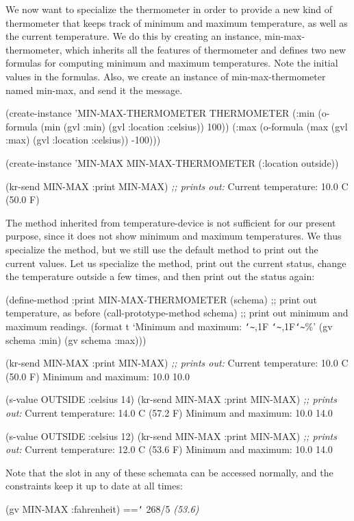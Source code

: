 We now want to specialize the {\sc thermometer} in order to
provide a new kind of thermometer that keeps track of minimum and maximum
temperature, as well as the current temperature.  We do this by creating an
instance, {\sc min-max-thermometer}, which inherits all the features of
{\sc thermometer} and defines two new formulas for computing minimum and
maximum temperatures.  Note the initial values in the formulas.  Also, we
create an instance of {\sc min-max-thermometer} named {\sc min-max}, and
send it the  message.
\begin{programexample}
(create-instance 'MIN-MAX-THERMOMETER THERMOMETER
  (:min (o-formula (min (gvl :min)
		        (gvl :location :celsius))
		   100))
  (:max (o-formula (max (gvl :max)
		        (gvl :location :celsius))
		   -100)))

(create-instance 'MIN-MAX MIN-MAX-THERMOMETER
   (:location outside))

(kr-send MIN-MAX :print MIN-MAX)
{\it ;; prints out:}
Current temperature: 10.0 C (50.0 F)
\end{programexample}
The  method inherited from {\sc temperature-device} is not
sufficient for our present purpose, since it does not show minimum and
maximum temperatures.  We thus specialize the
 method, but we still use the default  method to print
out the current values.  Let us specialize the method, print out the
current status, change the temperature outside a few times, and then print
out the status again:
\begin{programexample}
(define-method :print MIN-MAX-THERMOMETER (schema)
  ;; print out temperature, as before
  (call-prototype-method schema)
  ;; print out minimum and maximum readings.
  (format t `Minimum and maximum: {\tt\char`\~},1F  {\tt\char`\~},1F{\tt\char`\~}\%'
	  (gv schema :min)
	  (gv schema :max)))

(kr-send MIN-MAX :print MIN-MAX)
{\it ;; prints out:}
Current temperature: 10.0 C (50.0 F)
Minimum and maximum: 10.0  10.0

(s-value OUTSIDE :celsius 14)
(kr-send MIN-MAX :print MIN-MAX)
{\it ;; prints out:}
Current temperature: 14.0 C (57.2 F)
Minimum and maximum: 10.0  14.0

(s-value OUTSIDE :celsius 12)
(kr-send MIN-MAX :print MIN-MAX)
{\it ;; prints out:}
Current temperature: 12.0 C (53.6 F)
Minimum and maximum: 10.0  14.0
\end{programexample}
Note that the  slot in any of these schemata can be
accessed normally, and the constraints keep it up to date at all times:
\begin{programexample}
(gv MIN-MAX :fahrenheit)  =={\tt\char`\>} 268/5 {\it (53.6)}
\end{programexample}

